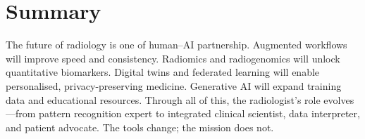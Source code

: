 \section{Summary}
The future of radiology is one of human--AI partnership. Augmented workflows will improve speed and consistency. Radiomics and radiogenomics will unlock quantitative biomarkers. Digital twins and federated learning will enable personalised, privacy-preserving medicine. Generative AI will expand training data and educational resources. Through all of this, the radiologist's role evolves---from pattern recognition expert to integrated clinical scientist, data interpreter, and patient advocate. The tools change; the mission does not.

\clearpage
